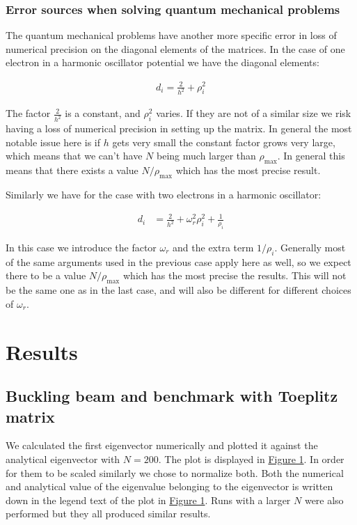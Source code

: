 \documentclass[reprint,english,notitlepage]{revtex4-1}  %
\begin{document}
\subsubsection{Error sources when solving quantum mechanical problems} \label{sec:III:b:i}

The quantum mechanical problems have another more specific error in loss of numerical precision on the diagonal elements of the matrices. In the case of one electron in a harmonic oscillator potential we have the diagonal elements:

\begin{align*}
d_i = \frac{2}{h^2} + \rho_i^2
\end{align*}

The factor $\frac{2}{h^2}$ is a constant, and $\rho_i^2$ varies. If they are not of a similar size we risk having a loss of numerical precision in setting up the matrix. In general the most notable issue here is if $h$ gets very small the constant factor grows very large, which means that we can't have $N$ being much larger than $\rho_\text{max}$. In general this means that there exists a value $N/\rho_\text{max}$ which has the most precise result.

Similarly we have for the case with two electrons in a harmonic oscillator:

\begin{align*}
d_i &= \frac{2}{h^2} + \omega_r^2 \rho_i^2 + \frac{1}{\rho_i}
\end{align*}

In this case we introduce the factor $\omega_r$ and the extra term $1/\rho_i$. Generally most of the same arguments used in the previous case apply here as well, so we expect there to be a value $N/\rho_\text{max}$ which has the most precise the results. This will not be the same one as in the last case, and will also be different for different choices of $\omega_r$.

\newpage

\section{Results} \label{sec:IV}

\subsection{Buckling beam and benchmark with Toeplitz matrix} \label{sec:IV:a}

We calculated the first eigenvector numerically and plotted it against the analytical eigenvector with $N=200$. The plot is displayed in \hyperref[fig:IV:a:1]{Figure 1}. In order for them to be scaled similarly we chose to normalize both. Both the numerical and analytical value of the eigenvalue belonging to the eigenvector is written down in the legend text of the plot in \hyperref[fig:IV:a:1]{Figure 1}. Runs with a larger $N$ were also performed but they all produced similar results.
\end{document}

